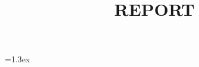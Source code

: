 \def\eqvsp{}  \newdimen\paravsp  \paravsp=1.3ex
\def\paradot#1{\vspace{\paravsp plus 0.5\paravsp minus 0.5\paravsp}\noindent{\bf\boldmath{#1.}}}

\title{
REPORT
}




%

\newcommand{\fix}{\marginpar{FIX}}
\newcommand{\new}{\marginpar{NEW}}




\maketitle


